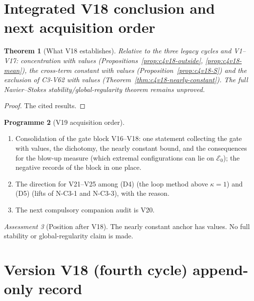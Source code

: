 \documentclass[11pt]{article}
\theoremstyle{plain}
\newtheorem{theorem}{Theorem}[section]
\theoremstyle{definition}
\newtheorem{programme}[theorem]{Programme}
\theoremstyle{remark}
\newtheorem{assessment}[theorem]{Assessment}
\begin{document}
\section{Integrated V18 conclusion and next acquisition order}
\label{sec:c4v18-conclusion}

\begin{theorem}[What V18 establishes]
\label{thm:c4v18-conclusion}
Relative to the three legacy cycles and V1--V17: concentration with
values (Propositions~\ref{prop:c4v18-outside}, \ref{prop:c4v18-mean}), the
cross-term constant with values (Proposition~\ref{prop:c4v18-S}) and the
exclusion of C3-V62 with values (Theorem~\ref{thm:c4v18-nearly-constant}).
The full Navier--Stokes stability/global-regularity theorem remains
unproved.
\end{theorem}

\begin{proof}
The cited results.
\end{proof}

\begin{programme}[V19 acquisition order]
\label{prog:c4v19}
\begin{enumerate}[label=\textup{(AC\arabic*)},leftmargin=4.8em]
\item Consolidation of the gate block V16--V18: one statement
      collecting the gate with values, the dichotomy, the nearly
      constant bound, and the consequences for the blow-up measure
      (which extremal configurations can lie on \(\mathcal E_0\)); the negative
      records of the block in one place.
\item The direction for V21--V25 among (D4) (the loop method above
      \(\kappa=1\)) and (D5) (lifts of N-C3-1 and N-C3-3), with the reason.
\item The next compulsory companion audit is V20.
\end{enumerate}
\end{programme}

\begin{assessment}[Position after V18]
\label{ass:c4v18-position}
The nearly constant anchor has values.  No full stability or
global-regularity claim is made.
\end{assessment}

\section*{Version V18 (fourth cycle) append-only record}
\end{document}
